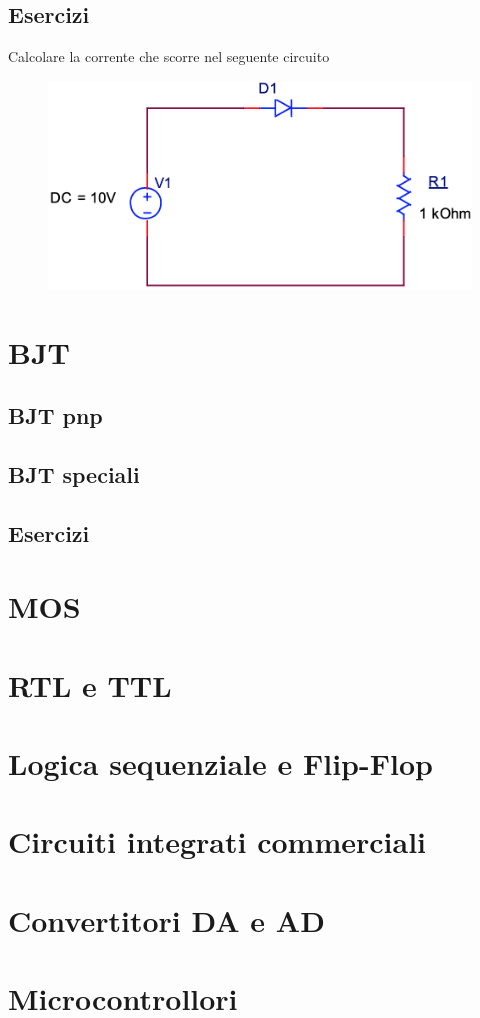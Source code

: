 \documentclass[12pt, a4paper]{report}
\begin{document}
\section{Esercizi}
Calcolare la corrente che scorre nel seguente circuito
\begin{figure}[h]
    \centering
    \includegraphics[scale=0.3,angle=0]{diodi_es1.png}
\end{figure}
\chapter{BJT}
\section{BJT pnp}
\section{BJT speciali}
\section{Esercizi}
\chapter{MOS}
\chapter{RTL e TTL}
\chapter{Logica sequenziale e Flip-Flop}
\chapter{Circuiti integrati commerciali}
\chapter{Convertitori DA e AD}
\chapter{Microcontrollori}
\end{document}
